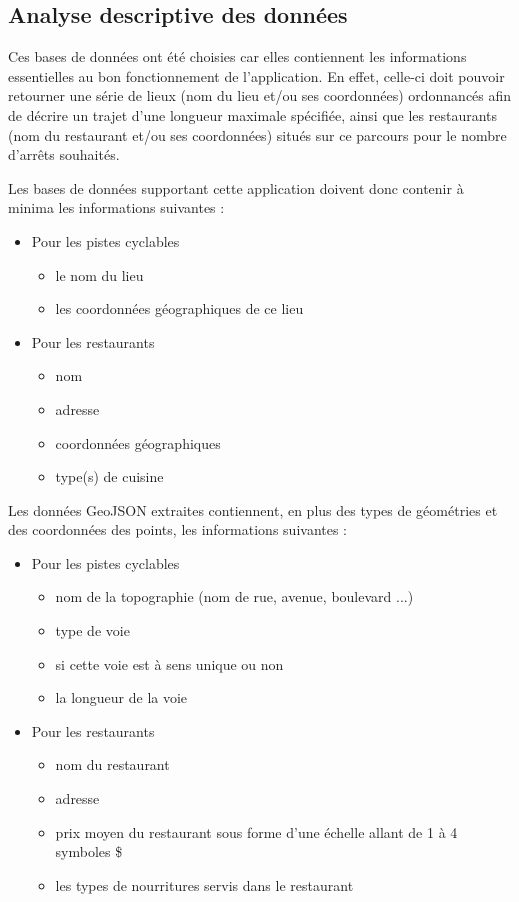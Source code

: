 \documentclass[11pt,a4paper]{article}
\begin{document}
\subsection{Analyse descriptive des données}

    Ces bases de données ont été choisies car elles contiennent les informations essentielles au bon fonctionnement de l'application. En effet, celle-ci doit pouvoir retourner une série de lieux (nom du lieu et/ou ses coordonnées) ordonnancés afin de décrire un trajet d'une longueur maximale spécifiée, ainsi que les restaurants (nom du restaurant et/ou ses coordonnées) situés  sur ce parcours pour le nombre d'arrêts souhaités. 
    
    Les bases de données supportant cette application doivent donc contenir à minima les informations suivantes :

    \begin{itemize}
        \item Pour les pistes cyclables
        \begin{itemize}
            \item le nom du lieu
            \item les coordonnées géographiques de ce lieu
        \end{itemize}
        \item Pour les restaurants
        \begin{itemize}
            \item nom
            \item adresse
            \item coordonnées géographiques
            \item type(s) de cuisine
        \end{itemize}
    \end{itemize}

    Les données GeoJSON extraites contiennent, en plus des types de géométries et des coordonnées des points, les informations suivantes :
     \begin{itemize}
         \item Pour les pistes cyclables
         \begin{itemize}
             \item nom de la topographie (nom de rue, avenue, boulevard ...)
             \item type de voie
             \item si cette voie est à sens unique ou non
             \item la longueur de la voie
         \end{itemize}
         \item Pour les restaurants
         \begin{itemize}
             \item nom du restaurant
             \item adresse
             \item prix moyen du restaurant sous forme d'une échelle allant de 1 à 4 symboles \$
             \item les types de nourritures servis dans le restaurant
         \end{itemize}
     \end{itemize}
\end{document}
